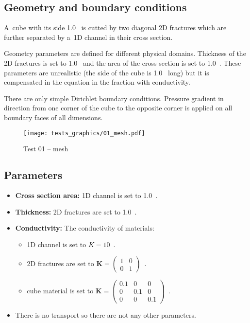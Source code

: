 \subsection*{Geometry and boundary conditions}
A~cube with its side 1.0~ is cutted by two diagonal 2D fractures which are further separated 
by a~1D channel in their cross section.

Geometry parameters are defined for different physical domains. Thickness of the 2D fractures is set to 
1.0~ and the area of the cross section is set to 1.0~. These parameters are 
unrealistic (the side of the cube is 1.0~ long) but it is compensated in the equation in 
the fraction with conductivity.

There are only simple Dirichlet boundary conditions. Pressure gradient in direction from one corner of the 
cube to the opposite corner is applied on all boundary faces of all dimensions.
%
\begin{figure}[htb!]
\centering
\texttt{[image: tests\_graphics/01\_mesh.pdf]}
\caption{Test 01 -- mesh}
\label{fig:test1_mesh}
\end{figure}
%
%
\subsection*{Parameters}
\begin{itemize}
  \item \textbf{Cross section area:} 1D channel is set to 1.0~.
  \item \textbf{Thickness:} 2D fractures are set to 1.0~.
  \item \textbf{Conductivity:} The conductivity of materials:
    \begin{itemize}
      \item 1D channel is set to $K=10$~.
      \item 2D fractures are set to $\mathbf{K}=\left(\begin{array}{cc} 1 & 0 \\ 0 & 1\end{array} \right)$~.
      \item cube material is set to $\mathbf{K}=\left(\begin{array}{ccc} 0.1 & 0 & 0 \\ 0 & 0.1 & 0 \\ 0 & 0 & 0.1\end{array} \right)$~.
    \end{itemize}
  \item There is no transport so there are not any other parameters.
\end{itemize}


